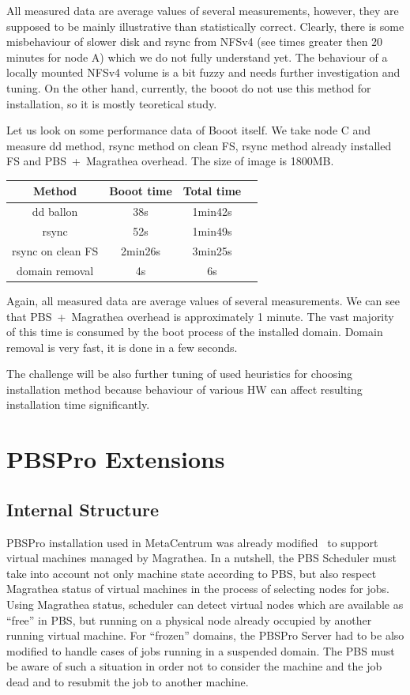 \documentclass[a4paper]{article}
\begin{document}
\bigskip

All measured data are average values of several measurements, however, they 
are supposed to be mainly illustrative than statistically correct.
Clearly, there is some misbehaviour of slower disk and rsync from NFSv4
(see times greater then 20 minutes for node A) which we do not fully understand yet. 
The behaviour of a locally
mounted NFSv4 volume is a bit fuzzy and needs further investigation and
tuning. On the other hand, currently, the booot do not use this method 
for installation, so it is mostly teoretical study.

Let us look on some performance data of Booot itself. We take node C and 
measure dd
method, rsync method on clean FS, rsync method already installed FS and
PBS~+~Magrathea overhead. The size of image is 1800MB.

\bigskip

\begin{tabular}{|c|c|c|c|}
\hline
Method & Booot time & Total time \\
\hline
dd ballon &  38s & 1min42s \\
\hline
rsync & 52s & 1min49s \\
\hline
rsync on clean FS & 2min26s & 3min25s \\
\hline
domain removal & 4s & 6s \\
\hline
\end{tabular}

\bigskip

Again, all measured data are average values of several measurements. 
We can see that PBS~+~Magrathea overhead is approximately 1 minute. The vast
majority of this time is consumed by the boot process of the installed
domain. Domain removal is very fast, it is done in a few seconds.

The challenge will be also further tuning of used heuristics for choosing 
installation method
because behaviour of various HW can affect resulting installation time
significantly. 

\section{PBSPro Extensions}
\label{pbs}

\subsection{Internal Structure}

PBSPro installation used in MetaCentrum was already modified~\cite{sc07} to support virtual machines managed by 
Magrathea. In a nutshell, the PBS Scheduler must take into account not only machine state
according to PBS, but also respect Magrathea status of virtual machines in the
process of selecting nodes for jobs. Using Magrathea status, scheduler 
can detect virtual nodes which are available as ``free'' in
PBS, but running on a physical node already occupied by another running virtual machine. 
For ``frozen'' domains, the PBSPro Server had to be also modified to handle cases of jobs running in a suspended domain.
The PBS must be aware of such a situation in order not to consider the machine and the job dead and to resubmit
the job to another machine.
\end{document}
